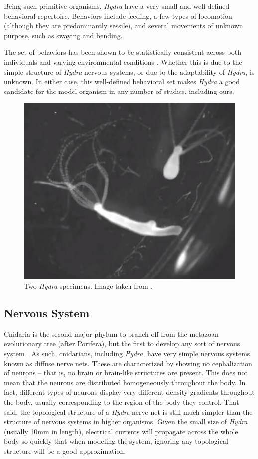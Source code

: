 \documentclass{article}
\begin{document}
Being such primitive organisms, \textit{Hydra} have a very small and well-defined behavioral repertoire. Behaviors include feeding, a few types of locomotion (although they are predominantly sessile), and several movements of unknown purpose, such as swaying and bending.

The set of behaviors has been shown to be statistically consistent across both individuals and varying environmental conditions \cite{behavior}. Whether this is due to the simple structure of \textit{Hydra} nervous systems, or due to the adaptability of \textit{Hydra}, is unknown. In either case, this well-defined behavioral set makes \textit{Hydra} a good candidate for the model organism in any number of studies, including ours.

\begin{figure}[!htb]
    \centering
    \includegraphics[scale=0.35]{final_paper/hydra.jpg}
    \caption{Two \textit{Hydra} specimens. Image taken from \cite{behavior}.}
    \label{fig:hydra}
\end{figure}

\subsection{Nervous System}
Cnidaria is the second major phylum to branch off from the metazoan evolutionary tree (after Porifera), but the first to develop any sort of nervous system \cite{first}. As such, cnidarians, including \textit{Hydra}, have very simple nervous systems known as diffuse nerve nets. These are characterized by showing no cephalization of neurons -- that is, no brain or brain-like structures are present. This does not mean that the neurons are distributed homogeneously throughout the body. In fact, different types of neurons display very different density gradients throughout the body, usually corresponding to the region of the body they control. That said, the topological structure of a \textit{Hydra} nerve net is still much simpler than the structure of nervous systems in higher organisms. Given the small size of \textit{Hydra} (usually 10mm in length), electrical currents will propagate across the whole body so quickly that when modeling the system, ignoring any topological structure will be a good approximation.
\end{document}
